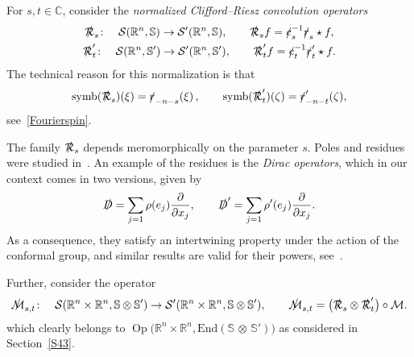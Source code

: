 \documentclass[pdftex]{sigma}
\DeclareMathOperator{\Op}{Op}
\DeclareMathOperator{\symb}{symb}
\newcommand{\fsl}[1]{{\slashed{#1}}} %
\numberwithin{equation}{section}
\begin{document}
For $s,t\in \mathbb C$, consider the \emph{normalized Clifford--Riesz convolution operators}
\begin{gather}
\fsl{\mathcal R}_s \colon\quad \mathcal S(\mathbb R^n, \mathbb S)\to \mathcal S'(\mathbb R^n, \mathbb S), \qquad
\fsl{\mathcal R}_s f = \fsl{c}_s^{-1}\fsl{r}_s \star f ,\nonumber
\\
\fsl{\mathcal R}'_t \colon\quad \mathcal S(\mathbb R^n, \mathbb S')\to \mathcal S'(\mathbb R^n, \mathbb S' ), \qquad
\fsl{\mathcal R}'_t f = \fsl{c}_t^{-1}\fsl{r}'_t \star f .\label{defCR}
\end{gather}
The technical reason for this normalization is that
\begin{gather*}
\symb(\fsl{\mathcal R}_s)(\xi) = \fsl{r}_{-n-s}(\xi)\, ,\qquad
\symb(\fsl{\mathcal R}'_t)(\zeta) = \fsl{r}'_{-n-t}(\zeta) ,
\end{gather*}
see~\eqref{Fourierspin}.

The family $\fsl{\mathcal R}_s$ depends meromorphically on the parameter $s$. Poles and residues were studied in~\cite{co}. An example of the residues is the \emph{Dirac operators}, which in our context comes in two versions, given by
\begin{gather*}\label{defDirac}
\fsl{D} = \sum_{j=1} \rho(e_j) \frac{\partial}{\partial x_j}, \qquad \fsl{D}' = \sum_{j=1} \rho'(e_j) \frac{\partial}{\partial x_j} .
\end{gather*}
As a consequence, they satisfy an intertwining property under the action of the conformal group, and similar results are valid for their powers, see~\cite{co}.

Further, consider the operator
\begin{gather*}
\fsl{\mathcal{M}}_{s,t} \colon\quad \mathcal S(\mathbb R^n\times \mathbb R^n, \mathbb S\otimes \mathbb S')\to \mathcal S'(\mathbb R^n\times \mathbb R^n, \mathbb S\otimes \mathbb S')
,\qquad \fsl{\mathcal{M}}_{s,t} = \big(\fsl{\mathcal R}_s\otimes \fsl{\mathcal R}'_t\big)\circ \mathcal M .
\end{gather*}
which clearly belongs to $\Op\big(\mathbb R^n\times \mathbb R^n, \mathrm{End}(\mathbb{S}\, \otimes\, \mathbb{S}')\big)$ as considered in Section~\ref{S43}.
\end{document}
